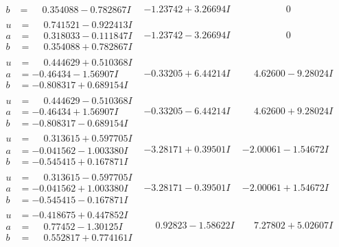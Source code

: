 \documentclass[1p]{elsarticle_modified}
\theoremstyle{definition}
\begin{document}
$$\begin{array}{c|c|c}
\begin{aligned}
b &= \phantom{-}0.354088 - 0.782867 I\end{aligned}
 & -1.23742 + 3.26694 I & \phantom{-0.000000 } 0 \\ \hline\begin{aligned}
u &= \phantom{-}0.741521 - 0.922413 I \\
a &= \phantom{-}0.318033 - 0.111847 I \\
b &= \phantom{-}0.354088 + 0.782867 I\end{aligned}
 & -1.23742 - 3.26694 I & \phantom{-0.000000 } 0 \\ \hline\begin{aligned}
u &= \phantom{-}0.444629 + 0.510368 I \\
a &= -0.46434 - 1.56907 I \\
b &= -0.808317 + 0.689154 I\end{aligned}
 & -0.33205 + 6.44214 I & \phantom{-}4.62600 - 9.28024 I \\ \hline\begin{aligned}
u &= \phantom{-}0.444629 - 0.510368 I \\
a &= -0.46434 + 1.56907 I \\
b &= -0.808317 - 0.689154 I\end{aligned}
 & -0.33205 - 6.44214 I & \phantom{-}4.62600 + 9.28024 I \\ \hline\begin{aligned}
u &= \phantom{-}0.313615 + 0.597705 I \\
a &= -0.041562 - 1.003380 I \\
b &= -0.545415 + 0.167871 I\end{aligned}
 & -3.28171 + 0.39501 I & -2.00061 - 1.54672 I \\ \hline\begin{aligned}
u &= \phantom{-}0.313615 - 0.597705 I \\
a &= -0.041562 + 1.003380 I \\
b &= -0.545415 - 0.167871 I\end{aligned}
 & -3.28171 - 0.39501 I & -2.00061 + 1.54672 I \\ \hline\begin{aligned}
u &= -0.418675 + 0.447852 I \\
a &= \phantom{-}0.77452 - 1.30125 I \\
b &= \phantom{-}0.552817 + 0.774161 I\end{aligned}
 & \phantom{-}0.92823 - 1.58622 I & \phantom{-}7.27802 + 5.02607 I \\ \hline\begin{aligned}

\end{aligned}
\end{array}$$
\end{document}
